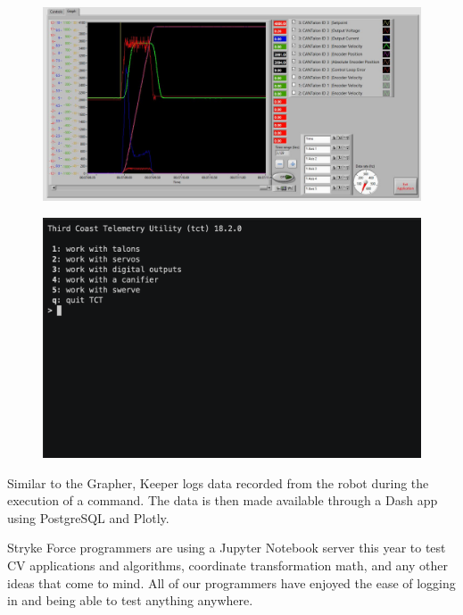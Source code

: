 \documentclass[10pt,tumble]{leaflet}
\begin{document}
\begin{figure}[H]
	\centering
	\includegraphics[scale=0.2]{assets/grapher}
\end{figure}

\begin{figure}[H]
	\centering
	\includegraphics[scale=0.35]{assets/tct}
\end{figure}

Similar to the Grapher, Keeper logs data recorded from the robot during the execution of a command. The data is then made available through a Dash app using PostgreSQL and Plotly.

Stryke Force programmers are using a Jupyter Notebook server this year to test CV applications and algorithms, coordinate transformation math, and any other ideas that come to mind. All of our programmers have enjoyed the ease of logging in and being able to test anything anywhere.

\begin{figure}[H]
 \centering
\end{figure}
\end{document}
